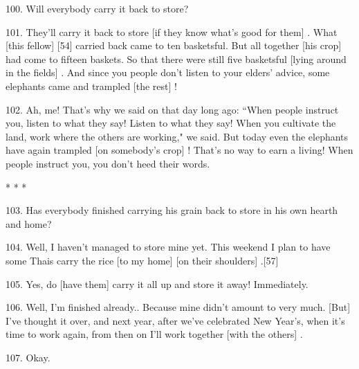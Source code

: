 100. Will everybody carry it back to store?

101. They'll carry it back to store [if they know what's good for them] . What
[this fellow] [54] carried back came to ten basketsful. But all together [his
crop] had come to fifteen baskets. So that there were still five basketsful [lying
around in the fields] . And since you people don't listen to your elders' advice,
some elephants came and trampled [the rest] !

102. Ah, me! That's why we said on that day long ago: ``When people instruct
you, listen to what they say! Listen to what they say! When you cultivate the land,
work where the others are working," we said. But today even the elephants
have again trampled [on somebody's crop] ! That's no way to earn a living! When
people instruct you, you don't heed their words.

\begin{center}
* * *
\end{center}

103. Has everybody finished carrying his grain back to store in his own hearth
and home?

104. Well, I haven't managed to store mine yet. This weekend I plan to have some
Thais carry the rice [to my home] [on their shoulders] .[57]

105. Yes, do [have them] carry it all up and store it away! Immediately.

106. Well, I'm finished already.. Because mine didn't amount to very much. [But]
I've thought it over, and next year, after we've celebrated New Year's, when it's
time to work again, from then on I'll work together [with the others] .

107. Okay.

